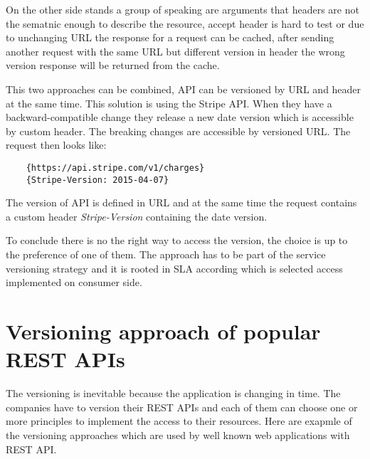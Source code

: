 On the other side stands a group of speaking are arguments that headers are not the sematnic enough to describe the resource, accept header is hard to test or due to unchanging URL the response for a request can be cached, after sending another request with the same URL but different version in header the wrong version response will be returned from the cache.

This two approaches can be combined, API can be versioned by URL and header at the same time. This solution is using the Stripe API. When they have a backward-compatible change they release a new date version which is accessible by custom header. The breaking changes are accessible by versioned URL. The request then looks like: 

\begin{lstlisting}
    {https://api.stripe.com/v1/charges}
    {Stripe-Version: 2015-04-07}
\end{lstlisting}

The version of API is defined in URL and at the same time the request contains a custom header \emph{Stripe-Version} containing the date version.

To conclude there is no the right way to access the version, the choice is up to the preference of one of them. The approach has to be part of the service versioning strategy and it is rooted in SLA according which is selected access implemented on consumer side.

\section{Versioning approach of popular REST APIs}
The versioning is inevitable because the application is changing in time. The companies have to version their REST APIs and each of them can choose one or more principles to implement the access to their resources. 
Here are exapmle of the versioning approaches which are used by well known web applications with REST API. \cite{website:restapi-example}

